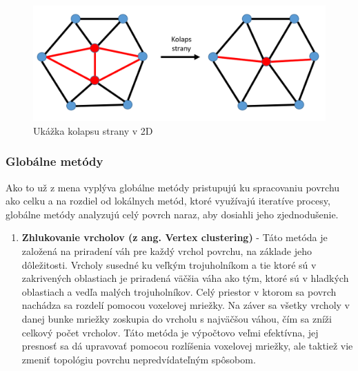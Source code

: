 \begin{enumerate}
    \begin{figure}[!htbp]
      \centering
      \includegraphics[width=12 cm]{img/edge_collapse.png}
      \caption{Ukážka kolapsu strany v 2D} 
      \label{fig:Edge_collapse}
    \end{figure} 
\end{enumerate}

\subsubsection{Globálne metódy}
\noindent Ako to už z mena vyplýva globálne metódy pristupujú ku spracovaniu povrchu ako celku a na rozdiel od lokálnych metód, ktoré využívajú iteratíve procesy, globálne metódy analyzujú celý povrch naraz, aby dosiahli jeho zjednodušenie.
\begin{enumerate}
    \item\textbf{Zhlukovanie vrcholov (z ang. Vertex clustering)} - Táto metóda je založená na priradení váh pre každý vrchol povrchu, na základe jeho dôležitosti. Vrcholy susedné ku veľkým trojuholníkom a tie ktoré sú v zakrivených oblastiach je priradená väčšia váha ako tým, ktoré sú v hladkých oblastiach a vedľa malých trojuholníkov. Celý priestor v ktorom sa povrch nachádza sa rozdelí pomocou voxelovej mriežky. Na záver sa všetky vrcholy v danej bunke mriežky zoskupia do vrcholu s najväčšou váhou, čím sa zníži celkový počet vrcholov. Táto metóda je výpočtovo veľmi efektívna, jej presnosť sa dá upravovať pomocou rozlíšenia voxelovej mriežky, ale taktiež vie zmeniť topológiu povrchu nepredvídateľným spôsobom. \cite{mesh_simplification}
\end{enumerate}

